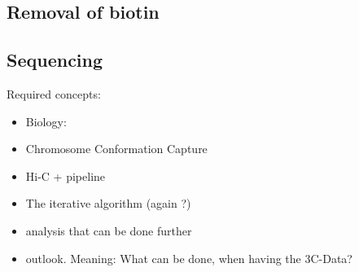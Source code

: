 \subsection{Removal of biotin}


\subsection{Sequencing}




%
%
%
%
%
%




Required concepts:
\begin{itemize}
    \item Biology:
    \item Chromosome Conformation Capture
    \item Hi-C  + pipeline
    \item The iterative algorithm (again ?)
    \item analysis that can be done further
    \item outlook. Meaning: What can be done, when having the 3C-Data?
\end{itemize}





